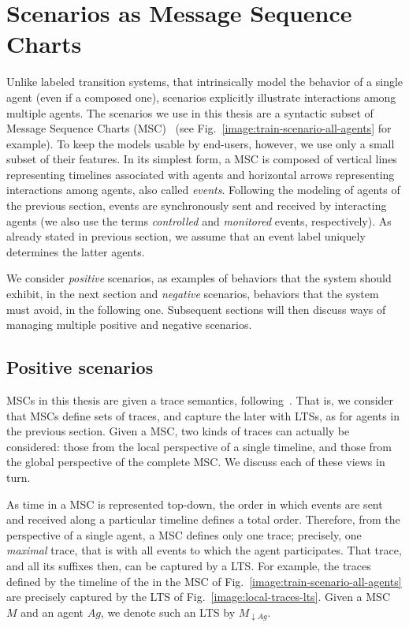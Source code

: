 \section{Scenarios as Message Sequence Charts}

Unlike labeled transition systems, that intrinsically model the behavior of a single agent (even if a composed one), scenarios explicitly illustrate interactions among multiple agents. The scenarios we use in this thesis are a syntactic subset of Message Sequence Charts (MSC)~\cite{ITU:1996} (see Fig.~\ref{image:train-scenario-all-agents} for example). To keep the models usable by end-users, however, we use only a small subset of their features. In its simplest form, a MSC is composed of vertical lines representing timelines associated with agents and horizontal arrows representing interactions among agents, also called \emph{events}. Following the modeling of agents of the previous section, events are synchronously sent and received by interacting agents (we also use the terms \emph{controlled} and \emph{monitored} events, respectively). As already stated in previous section, we assume that an event label uniquely determines the latter agents. 

We consider \emph{positive} scenarios, as examples of behaviors that the system should exhibit, in the next section and \emph{negative} scenarios, behaviors that the system must avoid, in the following one. Subsequent sections will then discuss ways of managing multiple positive and negative scenarios. 

\subsection{Positive scenarios\label{subsection:background-positive-scenarios}}

MSCs in this thesis are given a trace semantics, following~\cite{Uchitel:2004}. That is, we consider that MSCs define sets of traces, and capture the later with LTSs, as for agents in the previous section. Given a MSC, two kinds of traces can actually be considered: those from the local perspective of a single timeline, and those from the global perspective of the complete MSC. We discuss each of these views in turn.

As time in a MSC is represented top-down, the order in which events are sent and received along a particular timeline defines a total order. Therefore, from the perspective of a single agent, a MSC defines only one trace; precisely, one \emph{maximal} trace, that is with all events to which the agent participates. That trace, and all its suffixes then, can be captured by a LTS. For example, the traces defined by the timeline of the  in the MSC of Fig.~\ref{image:train-scenario-all-agents} are precisely captured by the LTS of Fig.~\ref{image:local-traces-lts}. Given a MSC $M$ and an agent $Ag$, we denote such an LTS by $M_{\downarrow Ag}$.

